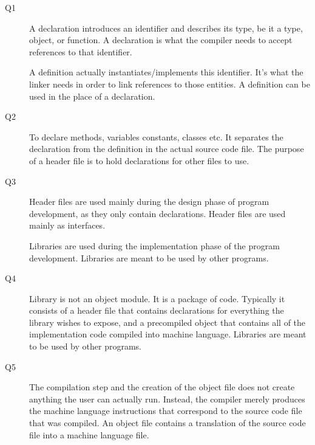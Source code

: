 \documentclass[a4paper]{article}
\begin{document}
\begin{description}
	\item[Q1]\-
	A declaration introduces an identifier and describes its type, be it a type, object, or function. A declaration is what the compiler needs to accept references to that identifier.
	
	A definition actually instantiates/implements this identifier. It's what the linker needs in order to link references to those entities. A definition can be used in the place of a declaration.
	\item[Q2]\-
	To declare methods, variables constants, classes etc. It separates the declaration from the definition in the actual source code file. The purpose of a header file is to hold declarations for other files to use.
	\item[Q3]\-
	Header files are used mainly during the design phase of program development, as they only contain declarations. Header files are used mainly as interfaces.

	Libraries are used during the implementation phase of the program development. Libraries are meant to be used by other programs. 
	\item[Q4]\-
	Library is not an object module. It is a package of code. Typically it consists of a header file that contains declarations for everything the library wishes to expose, and a precompiled object that contains all of the implementation code compiled into machine language. Libraries are meant to be used by other programs.
	\item[Q5]\-
	The compilation step and the creation of the object file does not create anything the user can actually run. Instead, the compiler merely produces the machine language instructions that correspond to the source code file that was compiled. An object file contains a translation of the source code file into a machine language file.
\end{description}
\end{document}
